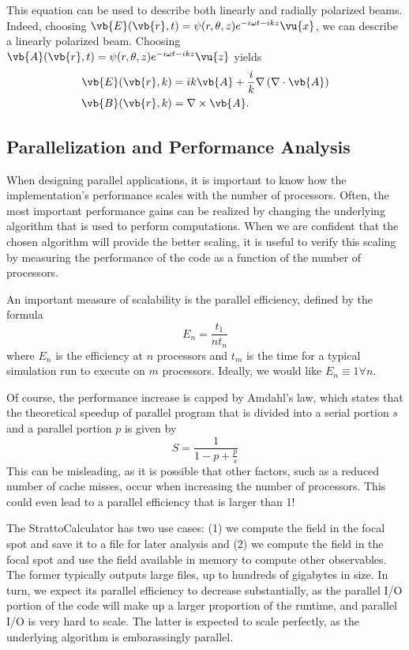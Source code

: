 \documentclass[11pt,SymmetricalJury]{inrsthesis/inrsthesis}
\begin{document}
This equation can be used to describe both linearly and radially polarized
beams. Indeed, choosing $\vb{E}(\vb{r},t)=\psi(r,\theta,z)e^{-i\omega t -ikz}\vu{x}$,
we can describe a linearly polarized beam. Choosing $\vb{A}(\vb{r},t)=\psi(r,\theta,z)e^{-i\omega t - ikz}\vu{z}$
yields
  \begin{align}
    \vb{E}(\vb{r},k) &= ik\vb{A}+\frac{i}{k}\nabla\left(\nabla\cdot\vb{A}\right) \\
    \vb{B}(\vb{r},k) &= \nabla\times\vb{A}.
  \end{align}


\subsection{Parallelization and Performance Analysis}

When designing parallel applications, it is important to know how the implementation's
performance scales with the number of processors. Often, the most important
performance gains can be realized by changing the underlying algorithm that
is used to perform computations. When we are confident that the chosen algorithm
will provide the better scaling, it is useful to verify this scaling by measuring
the performance of the code as a function of the number of processors.

An important measure of scalability is the parallel efficiency, defined by the
formula
  \begin{equation}
    E_n = \frac{t_1}{nt_n}
  \end{equation}
where $E_n$ is the efficiency at $n$ processors and $t_m$ is the time for a typical
simulation run to execute on $m$ processors. Ideally, we would like
$E_n\equiv1\forall n$.

Of course, the performance increase is capped by Amdahl's law, which states that
the theoretical speedup of parallel program that is divided into a serial portion
$s$ and a parallel portion $p$ is given by
  \begin{equation}
    S = \frac{1}{1-p+\frac{p}{s}}
  \end{equation}
This can be misleading, as it is possible that other factors, such as a reduced
number of cache misses, occur when increasing the number of processors.
This could even lead to a parallel efficiency that is larger than 1!

The StrattoCalculator has two use cases: (1) we compute the field in the
focal spot and save it to a file for later analysis and (2) we compute the
field in the focal spot and use the field available in memory to compute
other observables. The former typically outputs large files, up to hundreds
of gigabytes in size. In turn, we expect its parallel efficiency to decrease
substantially, as the parallel I/O portion of the code will make up a larger
proportion of the runtime, and parallel I/O is very hard to scale. 
The latter is expected to scale perfectly, as the underlying algorithm is
embarassingly parallel.
\end{document}
